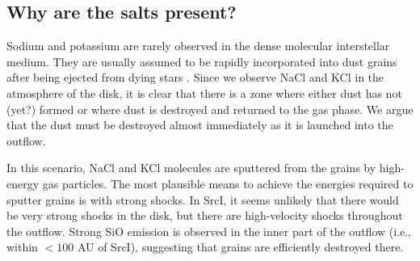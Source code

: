 \documentclass[twocolumn]{aastex62}
\newcommand{\sourcei}{SrcI\xspace}
\begin{document}
\subsection{Why are the salts present?}

Sodium and potassium are rarely observed in the dense molecular interstellar
medium.  They are usually assumed to be rapidly incorporated into dust grains
after being ejected from dying stars \citep[e.g.,][]{Milam2007a}.  Since we
observe NaCl and KCl in the atmosphere of the disk, it is clear that
there is a zone where either dust has not (yet?) formed or
where dust is destroyed and returned to the gas phase.  We argue that
the dust must be destroyed almost immediately as it is launched into the outflow.







In this scenario,  NaCl and KCl molecules are sputtered from the grains by
high-energy gas particles.  The most plausible means to achieve the energies
required to sputter grains is with strong shocks.  In \sourcei, it seems
unlikely that there would be very strong shocks in the disk, but there are
high-velocity shocks throughout the outflow. Strong SiO emission is observed in
the inner part of the outflow
(i.e., within $<100$ AU of \sourcei),
suggesting that grains are efficiently destroyed there.
\end{document}
